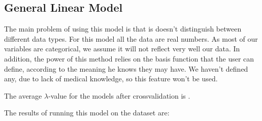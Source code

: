 \subsection{General Linear Model}

The main problem of using this model is that is doesn't distinguish between different data types. For this model all the data are real numbers. As most of our variables are categorical, we assume it will not reflect very well our data. In addition, the power of this method relies on the basis function that the user can define, according to the meaning he knows they may have. We haven't defined any, due to lack of medical knowledge, so this feature won't be used.

The average \(\lambda\)-value for the models after crossvalidation is .

The results of running this model on the dataset are:









